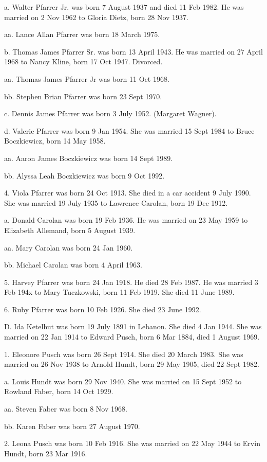 \documentclass[a4paper]{article}
\begin{document}
a. Walter Pfarrer Jr. was born 7 August 1937 and died 11 Feb 1982. He was married on 2 Nov 1962 to Gloria Dietz, born 28 Nov 1937.

aa. Lance Allan Pfarrer was born 18 March 1975.

b. Thomas James Pfarrer Sr. was born 13 April 1943.  He was married on 27 April 1968 to Nancy Kline, born 17 Oct 1947. Divorced.

aa. Thomas James Pfarrer Jr was born 11 Oct 1968.

bb. Stephen Brian Pfarrer was born 23 Sept 1970.

c. Dennis James Pfarrer was born 3 July 1952.  (Margaret Wagner).

d. Valerie Pfarrer was born 9 Jan 1954.  She was married 15 Sept 1984 to Bruce Boczkiewicz, born 14 May 1958.

aa. Aaron James Boczkiewicz was born 14 Sept 1989.

bb. Alyssa Leah Boczkiewicz was born 9 Oct 1992.

4. Viola Pfarrer was born 24 Oct 1913.  She died in a car accident 9 July 1990. She was married 19 July 1935 to Lawrence Carolan, born 19 Dec 1912.  

a. Donald Carolan was born 19 Feb 1936.  He was married on 23 May 1959 to Elizabeth Allemand, born 5 August 1939.

aa. Mary Carolan was born 24 Jan 1960.

bb. Michael Carolan was born 4 April 1963.

5. Harvey Pfarrer was born 24 Jan 1918.  He died 28 Feb 1987.  He was married 3 Feb 194x to Mary Tuczkowski, born 11 Feb 1919.  She died 11 June 1989.

6. Ruby Pfarrer was born 10 Feb 1926.  She died 23 June 1992.

D. Ida Ketelhut was born 19 July 1891 in Lebanon.  She died 4 Jan 1944.  She was married on 22 Jan 1914 to Edward Pusch, born 6 Mar 1884, died 1 August 1969.

1. Eleonore Pusch was born 26 Sept 1914.  She died 20 March 1983.  She was  married on 26 Nov 1938 to Arnold Hundt, born 29 May 1905, died 22 Sept 1982.

a. Louis Hundt was born 29 Nov 1940.   She was married on 15 Sept 1952 to Rowland Faber, born 14 Oct 1929.  

aa. Steven Faber was born 8 Nov 1968.

bb. Karen Faber was born 27 August 1970.

2. Leona Pusch was born 10 Feb 1916.  She was married on 22 May 1944 to Ervin Hundt, born 23 Mar 1916.
\end{document}
